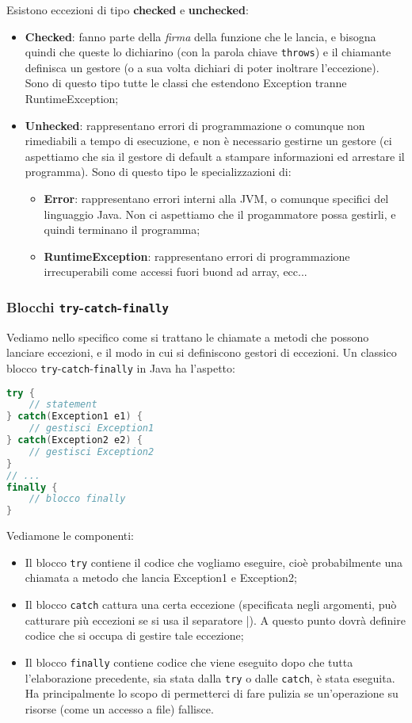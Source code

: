 \documentclass[a4paper,11pt]{article}
\begin{document}
Esistono eccezioni di tipo \textbf{checked} e \textbf{unchecked}:
\begin{itemize}
	\item \textbf{Checked}: fanno parte della \textit{firma} della funzione che le lancia, e bisogna quindi che queste lo dichiarino (con la parola chiave \lstinline|throws|) e il chiamante definisca un gestore (o a sua volta dichiari di poter inoltrare l'eccezione). Sono di questo tipo tutte le classi che estendono Exception tranne RuntimeException;
	\item \textbf{Unhecked}: rappresentano errori di programmazione o comunque non rimediabili a tempo di esecuzione, e non è necessario gestirne un gestore (ci aspettiamo che sia il gestore di default a stampare informazioni ed arrestare il programma). Sono di questo tipo le specializzazioni di:
		\begin{itemize}
			\item \textbf{Error}: rappresentano errori interni alla JVM, o comunque specifici del linguaggio Java. Non ci aspettiamo che il progammatore possa gestirli, e quindi terminano il programma;
			\item \textbf{RuntimeException}: rappresentano errori di programmazione irrecuperabili come accessi fuori buond ad array, ecc...
		\end{itemize}
\end{itemize}

\subsubsection{Blocchi \lstinline|try|-\lstinline|catch|-\lstinline|finally|}
Vediamo nello specifico come si trattano le chiamate a metodi che possono lanciare eccezioni, e il modo in cui si definiscono gestori di eccezioni.
Un classico blocco \lstinline|try|-\lstinline|catch|-\lstinline|finally| in Java ha l'aspetto:
\begin{lstlisting}[language=java, style=codestyle]	
try {
	// statement
} catch(Exception1 e1) {
	// gestisci Exception1
} catch(Exception2 e2) {
	// gestisci Exception2
}
// ...
finally {
	// blocco finally 
}
\end{lstlisting}

Vediamone le componenti:
\begin{itemize}
	\item Il blocco \lstinline|try| contiene il codice che vogliamo eseguire, cioè probabilmente una chiamata a metodo che lancia Exception1 e Exception2;
	\item Il blocco \lstinline|catch| cattura una certa eccezione (specificata negli argomenti, può catturare più eccezioni se si usa il separatore \lstinline|||). A questo punto dovrà definire codice che si occupa di gestire tale eccezione;
	\item Il blocco \lstinline|finally| contiene codice che viene eseguito dopo che tutta l'elaborazione precedente, sia stata dalla \lstinline|try| o dalle \lstinline|catch|, è stata eseguita. Ha principalmente lo scopo di permetterci di fare pulizia se un'operazione su risorse (come un accesso a file) fallisce.
\end{itemize}
\end{document}

